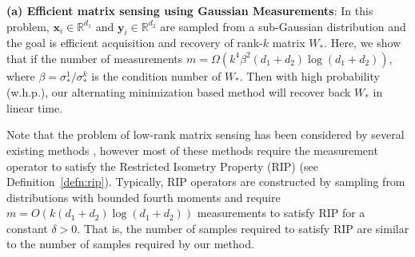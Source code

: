 \documentclass[11pt]{article}
\newcommand{\so}{\sigma_*}
\newcommand{\Wo}{W_*}
\newcommand{\x}{\bm{x}}
\newcommand{\y}{\bm{y}}
\begin{document}
 {\bf (a) Efficient matrix sensing using Gaussian Measurements}: In this problem, $\x_i\in \mathbb{R}^{d_1}$ and $\y_i\in \mathbb{R}^{d_2}$ are sampled from a sub-Gaussian distribution and the goal is efficient acquisition and recovery of rank-$k$ matrix $\Wo$. Here, we show that if the number of measurements $m=\Omega(k^4 \beta^2 (d_1+d_2) \log(d_1+d_2))$, where $\beta=\so^1/\so^k$ is the condition number of $\Wo$. Then with high probability (w.h.p.), our alternating minimization based method will recover back $\Wo$ in linear time. 

Note that the problem of low-rank matrix sensing has been considered by several existing methods \cite{RechtFP2007, JainMD10, LeeBre09}, however most of these methods require the measurement operator to satisfy the Restricted Isometry Property (RIP) (see Definition~\ref{defn:rip}). Typically, RIP operators are constructed by sampling from distributions with bounded fourth moments and require $m=O(k(d_1+d_2)\log(d_1+d_2))$ measurements to satisfy RIP for a constant $\delta>0$. That is, the number of samples required to satisfy RIP are similar to the number of samples required by our method. 
\end{document}
